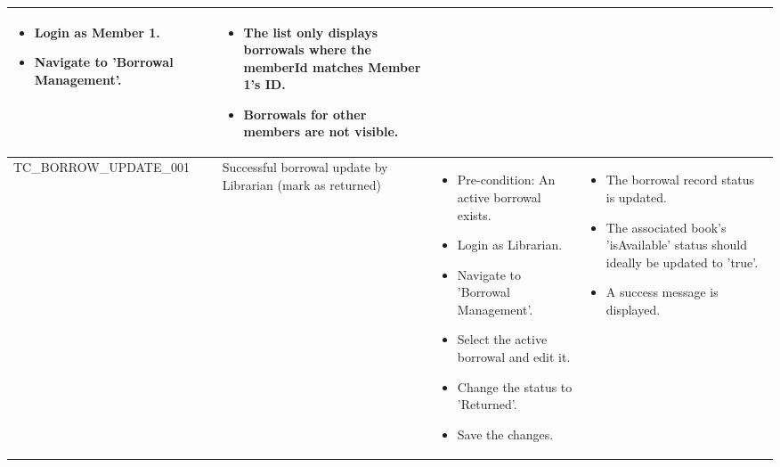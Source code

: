 \documentclass[10pt, a4paper]{report}
\begin{document}
\begin{longtable}{|>{\raggedright\arraybackslash}p{4.5cm}|>{\raggedright\arraybackslash}p{4cm}|>{\raggedright\arraybackslash}p{4.5cm}|>{\raggedright\arraybackslash}p{4cm}|}
\begin{itemize}[noitemsep, topsep=0pt, partopsep=0pt, leftmargin=*]
        \item Login as Member 1.
        \item Navigate to 'Borrowal Management'.
    \end{itemize} & 
    \begin{itemize}[noitemsep, topsep=0pt, partopsep=0pt, leftmargin=*]
        \item The list only displays borrowals where the memberId matches Member 1's ID.
        \item Borrowals for other members are not visible.
    \end{itemize} \\ \hline
TC\_BORROW\_UPDATE\_001 & Successful borrowal update by Librarian (mark as returned) & 
    \begin{itemize}[noitemsep, topsep=0pt, partopsep=0pt, leftmargin=*]
        \item Pre-condition: An active borrowal exists.
        \item Login as Librarian.
        \item Navigate to 'Borrowal Management'.
        \item Select the active borrowal and edit it.
        \item Change the status to 'Returned'.
        \item Save the changes.
    \end{itemize} & 
    \begin{itemize}[noitemsep, topsep=0pt, partopsep=0pt, leftmargin=*]
        \item The borrowal record status is updated.
        \item The associated book's 'isAvailable' status should ideally be updated to 'true'.
        \item A success message is displayed.
    \end{itemize} \\ \hline


\end{longtable}
\end{document}
